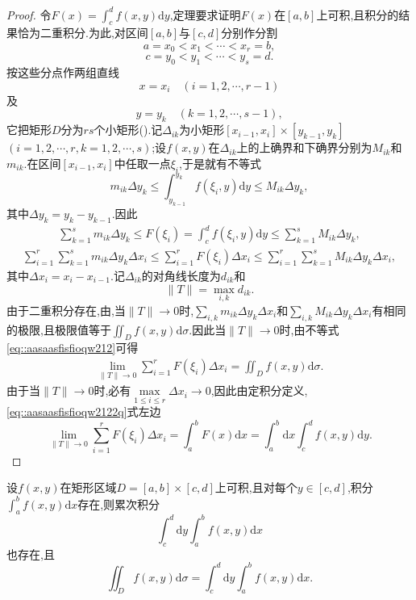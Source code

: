 \documentclass[../../main.tex]{subfiles}%
\begin{document}
\begin{proof}

令$F(x)=\int_c^d f(x,y)\mathrm{d}y$,定理要求证明$F(x)$在$[a,b]$上可积,且积分的结果恰为二重积分.为此,对区间$[a,b]$与$[c,d]$分别作分割
\[
a=x_0<x_1<\cdots<x_r=b,
\]
\[
c=y_0<y_1<\cdots<y_s=d.
\]
按这些分点作两组直线
\[
x=x_i\quad(i=1,2,\cdots,r-1)
\]
及
\[
y=y_k\quad(k=1,2,\cdots,s-1),
\]
它把矩形$D$分为$rs$个小矩形().记$\Delta_{ik}$为小矩形$[x_{i-1},x_i]\times[y_{k-1},y_k]$ $(i=1,2,\cdots,r,k=1,2,\cdots,s)$;设$f(x,y)$在$\Delta_{ik}$上的上确界和下确界分别为$M_{ik}$和$m_{ik}$.在区间$[x_{i-1},x_i]$中任取一点$\xi_i$,于是就有不等式
\[
m_{ik}\Delta y_k \leqslant \int_{y_{k-1}}^{y_k} f(\xi_i,y)\mathrm{d}y \leqslant M_{ik}\Delta y_k,
\]
其中$\Delta y_k=y_k-y_{k-1}$.因此
\begin{align*}
\sum_{k=1}^s m_{ik}\Delta y_k \leqslant F(\xi_i)=\int_c^d f(\xi_i,y)\mathrm{d}y \leqslant \sum_{k=1}^s M_{ik}\Delta y_k,
\end{align*}
\begin{align}
\sum_{i=1}^r \sum_{k=1}^s m_{ik}\Delta y_k\Delta x_i \leqslant \sum_{i=1}^r F(\xi_i)\Delta x_i \leqslant \sum_{i=1}^r \sum_{k=1}^s M_{ik}\Delta y_k\Delta x_i, \label{eq::aasaasfisfioqw212}
\end{align}
其中$\Delta x_i=x_i-x_{i-1}$.记$\Delta_{ik}$的对角线长度为$d_{ik}$和
\[
\|T\|=\max\limits_{i,k} d_{ik}.
\]
由于二重积分存在,由,当$\|T\|\to0$时,$\sum\limits_{i,k} m_{ik}\Delta y_k\Delta x_i$和$\sum\limits_{i,k} M_{ik}\Delta y_k\Delta x_i$有相同的极限,且极限值等于$\iint_D f(x,y)\mathrm{d}\sigma$.因此当$\|T\|\to0$时,由不等式\eqref{eq::aasaasfisfioqw212}可得
\begin{align*}
\lim_{\|T\|\to0} \sum_{i=1}^r F(\xi_i)\Delta x_i = \iint_D f(x,y)\mathrm{d}\sigma. \label{eq::aasaasfisfioqw2122q}
\end{align*}
由于当$\|T\|\to0$时,必有$\max\limits_{1\leqslant i\leqslant r}\Delta x_i\to0$,因此由定积分定义,\eqref{eq::aasaasfisfioqw2122q}式左边
\[
\lim_{\|T\|\to0} \sum_{i=1}^r F(\xi_i)\Delta x_i = \int_a^b F(x)\mathrm{d}x = \int_a^b \mathrm{d}x \int_c^d f(x,y)\mathrm{d}y.
\]

\end{proof}

\begin{theorem}\label{theorem:数分--二重积分计算定理--2}
设$f(x,y)$在矩形区域$D=[a,b]\times[c,d]$上可积,且对每个$y\in[c,d]$,积分$\int_a^b f(x,y)\mathrm{d}x$存在,则累次积分
\[
\int_c^d \mathrm{d}y \int_a^b f(x,y)\mathrm{d}x
\]
也存在,且
\[
\iint_D f(x,y)\mathrm{d}\sigma = \int_c^d \mathrm{d}y \int_a^b f(x,y)\mathrm{d}x.
\]
\end{theorem}
\end{document}
